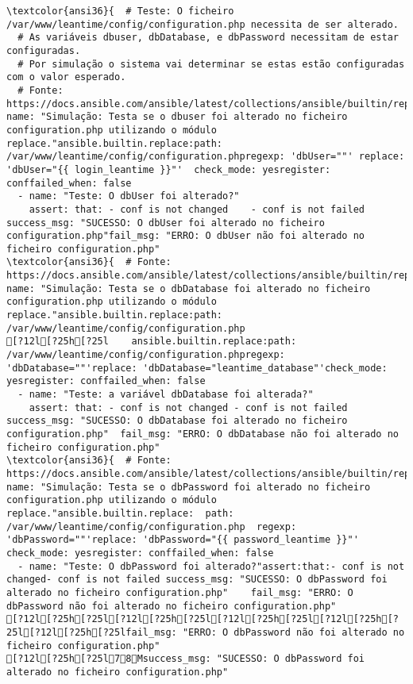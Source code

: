 \documentclass{scrartcl}
\begin{document}
\begin{Verbatim}
\textcolor{ansi36}{  # Teste: O ficheiro /var/www/leantime/config/configuration.php necessita de ser alterado.
  # As variáveis dbuser, dbDatabase, e dbPassword necessitam de estar configuradas.
  # Por simulação o sistema vai determinar se estas estão configuradas com o valor esperado.
  # Fonte: https://docs.ansible.com/ansible/latest/collections/ansible/builtin/replace_module.html}- name: "Simulação: Testa se o dbuser foi alterado no ficheiro configuration.php utilizando o módulo replace."ansible.builtin.replace:path: /var/www/leantime/config/configuration.phpregexp: 'dbUser=""' replace: 'dbUser="{{ login_leantime }}"'  check_mode: yesregister: conffailed_when: false
  - name: "Teste: O dbUser foi alterado?"
    assert: that: - conf is not changed    - conf is not failed  success_msg: "SUCESSO: O dbUser foi alterado no ficheiro configuration.php"fail_msg: "ERRO: O dbUser não foi alterado no ficheiro configuration.php"
\textcolor{ansi36}{  # Fonte: https://docs.ansible.com/ansible/latest/collections/ansible/builtin/replace_module.html}- name: "Simulação: Testa se o dbDatabase foi alterado no ficheiro configuration.php utilizando o módulo replace."ansible.builtin.replace:path: /var/www/leantime/config/configuration.php
[?12l[?25h[?25l    ansible.builtin.replace:path: /var/www/leantime/config/configuration.phpregexp: 'dbDatabase=""'replace: 'dbDatabase="leantime_database"'check_mode: yesregister: conffailed_when: false
  - name: "Teste: a variável dbDatabase foi alterada?"
    assert: that: - conf is not changed - conf is not failed    success_msg: "SUCESSO: O dbDatabase foi alterado no ficheiro configuration.php"  fail_msg: "ERRO: O dbDatabase não foi alterado no ficheiro configuration.php"
\textcolor{ansi36}{  # Fonte: https://docs.ansible.com/ansible/latest/collections/ansible/builtin/replace_module.html}- name: "Simulação: Testa se o dbPassword foi alterado no ficheiro configuration.php utilizando o módulo replace."ansible.builtin.replace:  path: /var/www/leantime/config/configuration.php  regexp: 'dbPassword=""'replace: 'dbPassword="{{ password_leantime }}"'  check_mode: yesregister: conffailed_when: false
  - name: "Teste: O dbPassword foi alterado?"assert:that:- conf is not changed- conf is not failed success_msg: "SUCESSO: O dbPassword foi alterado no ficheiro configuration.php"    fail_msg: "ERRO: O dbPassword não foi alterado no ficheiro configuration.php"
[?12l[?25h[?25l[?12l[?25h[?25l[?12l[?25h[?25l[?12l[?25h[?25l[?12l[?25h[?25lfail_msg: "ERRO: O dbPassword não foi alterado no ficheiro configuration.php"
[?12l[?25h[?25l78Msuccess_msg: "SUCESSO: O dbPassword foi alterado no ficheiro configuration.php"

\end{Verbatim}
\end{document}
